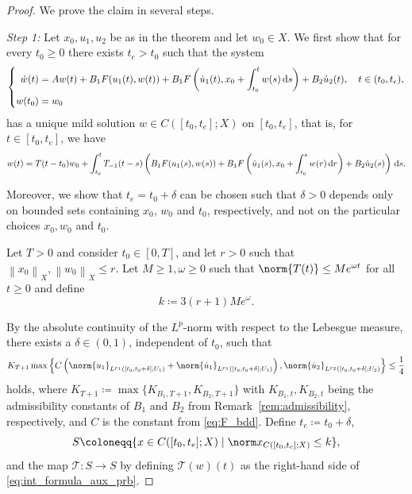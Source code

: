 \documentclass{cocv}
\renewcommand{\d}{\,\mathrm{d}}
\newcommand{\ds}{ {\, \rm d} s}
\newcommand{\nm}[2][]{\left\lVert #2 \right\rVert_{#1}}
\theoremstyle{definition}
\begin{document}
\begin{proof}
    We prove the claim in several steps. 
    
     \emph{Step 1:} Let $x_0, u_1, u_2$ be as in the theorem and let $w_0 \in X$. 
     We first show that for every $t_0\geq 0$ there exists $t_e>t_0$ such that the system
     \begin{equation}\label{eq:aux_derivative_solution}
        \left\{\begin{aligned}
            \dot{w}(t) &= Aw(t) + B_1F(u_1(t),w(t)) + B_1F\left(\dot{u}_1(t), x_0 + \int_{t_0}^t w(s) \ds\right) + B_2\dot u_2(t) ,\quad t \in (t_0,t_e),\\
        w(t_0)&=w_0
        \end{aligned}\right.
    \end{equation}
    has a unique mild solution $w\in C([t_0, t_e];X)$ on $[t_0, t_e]$, that is, for $t \in [t_0,t_e]$, we have
    \begin{equation}\label{eq:int_formula_aux_prb}
        w(t) = T(t-t_0)w_0 + \int_{t_0}^{t} T_{-1}(t-s)\left(B_1F(u_1(s),w(s)) + B_1F\left(\dot u_1(s),x_0 + \int_{t_0}^s w(r)\d r\right) +B_2 \dot u_2(s)\right)\ds.
    \end{equation}
    
    Moreover, we show that $t_e=t_0+\delta$ can be chosen such that $\delta > 0$ depends only on bounded sets containing $x_0$, $w_0$ and $t_0$, respectively, and not on the particular choices $x_0, w_0$ and $t_0$.

    Let $T>0$ and consider $t_0 \in [0,T]$, and let $r > 0$ such that $\nm[X]{x_0}, \nm[X]{w_0}\leq r$. 
    Let $M\ge1,\omega \ge 0$ such that $\norm{T(t)} \le Me^{\omega t}$ for all $t\ge 0$ and define
  \[
  k \coloneqq  3(r+1)Me^{\omega}.
  \]

    By the absolute continuity of the $L^p$-norm with respect to the Lebesgue measure, there exists a $\delta \in (0, 1)$, independent of $t_0$, such that 
\begin{equation}
    K_{T+1}\max\left\{C\left(\norm{u_1}_{L^{p_1}([t_0, t_0+\delta];U_1)} + \norm{\dot u_1}_{L^{p_1}([t_0, t_0+\delta];U_1)}\right), \norm{\dot u_2}_{L^{p_2}([t_0, t_0+\delta];U_2)}\right\} \leq \frac{1}{4}
\end{equation}    
    holds, where $K_{T+1} \coloneqq \max  \{K_{B_1,T+1}, K_{B_2,T+1}\}$ with $K_{B_1,t}, K_{B_2,t}$ being the admissibility constants of $B_1$ and $B_2$ from Remark~\ref{rem:admissibility}, respectively, and $C$ is the constant from \eqref{eq:F_bdd}.
    Define $t_e \coloneqq t_0+\delta$, 
    \begin{equation*}
        S\coloneqq \{x \in C([t_0, t_e];X) \mid \norm x_{C([t_0, t_e]; X)} \le k\},
    \end{equation*}
    and the map $\mathcal T: S \to S$ by defining $\mathcal T(w)(t)$ as the right-hand side of \eqref{eq:int_formula_aux_prb}.
    

\end{proof}
\end{document}
